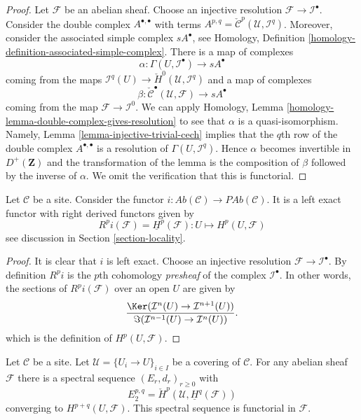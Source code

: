 \begin{proof}
Let $\mathcal{F}$ be an abelian sheaf. Choose an injective resolution
$\mathcal{F} \to \mathcal{I}^\bullet$. Consider the double complex
$A^{\bullet, \bullet}$ with terms
$A^{p, q} = \check{\mathcal{C}}^p(\mathcal{U}, \mathcal{I}^q)$.
Moreover, consider the associated simple complex
$sA^\bullet$, see
Homology, Definition \ref{homology-definition-associated-simple-complex}.
There is a map of complexes
$$
\alpha :
\Gamma(U, \mathcal{I}^\bullet)
\longrightarrow
sA^\bullet
$$
coming from the maps
$\mathcal{I}^q(U) \to \check{H}^0(\mathcal{U}, \mathcal{I}^q)$
and a map of complexes
$$
\beta :
\check{\mathcal{C}}^\bullet(\mathcal{U}, \mathcal{F})
\longrightarrow
sA^\bullet
$$
coming from the map $\mathcal{F} \to \mathcal{I}^0$.
We can apply
Homology, Lemma \ref{homology-lemma-double-complex-gives-resolution}
to see that $\alpha$ is a quasi-isomorphism.
Namely, Lemma \ref{lemma-injective-trivial-cech} implies that
the $q$th row of the double complex $A^{\bullet, \bullet}$ is a
resolution of $\Gamma(U, \mathcal{I}^q)$.
Hence $\alpha$ becomes invertible in $D^{+}(\mathbf{Z})$ and
the transformation of the lemma is the composition of $\beta$
followed by the inverse of $\alpha$. We omit the verification
that this is functorial.
\end{proof}

\begin{lemma}
\label{lemma-include}
Let $\mathcal{C}$ be a site.
Consider the functor
$i : \textit{Ab}(\mathcal{C}) \to \textit{PAb}(\mathcal{C})$.
It is a left exact functor with right derived functors given by
$$
R^pi(\mathcal{F}) = \underline{H}^p(\mathcal{F}) :
U \longmapsto H^p(U, \mathcal{F})
$$
see discussion in Section \ref{section-locality}.
\end{lemma}

\begin{proof}
It is clear that $i$ is left exact.
Choose an injective resolution $\mathcal{F} \to \mathcal{I}^\bullet$.
By definition $R^pi$ is the $p$th cohomology {\it presheaf}
of the complex $\mathcal{I}^\bullet$. In other words, the
sections of $R^pi(\mathcal{F})$ over an open $U$ are given by
$$
\frac{\Ker(\mathcal{I}^n(U) \to \mathcal{I}^{n + 1}(U))}
{\Im(\mathcal{I}^{n - 1}(U) \to \mathcal{I}^n(U))}.
$$
which is the definition of $H^p(U, \mathcal{F})$.
\end{proof}

\begin{lemma}
\label{lemma-cech-spectral-sequence}
Let $\mathcal{C}$ be a site.
Let $\mathcal{U} = \{U_i \to U\}_{i \in I}$ be a covering of $\mathcal{C}$.
For any abelian sheaf $\mathcal{F}$ there
is a spectral sequence $(E_r, d_r)_{r \geq 0}$ with
$$
E_2^{p, q} = \check{H}^p(\mathcal{U}, \underline{H}^q(\mathcal{F}))
$$
converging to $H^{p + q}(U, \mathcal{F})$.
This spectral sequence is functorial in $\mathcal{F}$.
\end{lemma}

